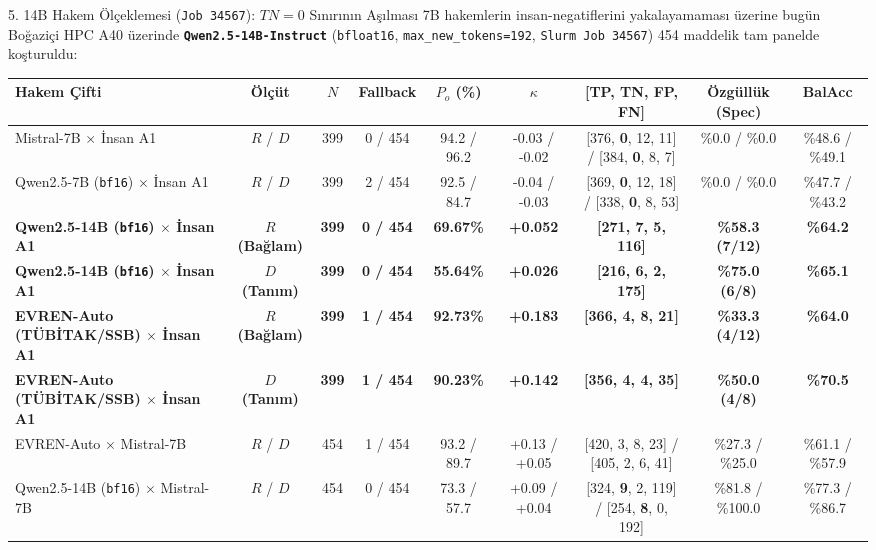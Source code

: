 \documentclass[aspectratio=169,10pt]{beamer}
\begin{document}
\begin{frame}{5. 14B Hakem Ölçeklemesi (\texttt{Job 34567}): $TN = 0$ Sınırının Aşılması}
\scriptsize
7B hakemlerin insan-negatiflerini yakalayamaması üzerine bugün Boğaziçi HPC A40 üzerinde \textbf{\texttt{Qwen2.5-14B-Instruct}} (\texttt{bfloat16}, \texttt{max\_new\_tokens=192}, \texttt{Slurm Job 34567}) 454 maddelik tam panelde koşturuldu:

\vspace{0.1cm}
\begin{table}
\centering
\scriptsize
\begin{tabular}{lcccccccc}
\toprule
\textbf{Hakem Çifti} & \textbf{Ölçüt} & \textbf{$N$} & \textbf{Fallback} & \textbf{$P_o$ (\%)} & \textbf{$\kappa$} & \textbf{[TP, TN, FP, FN]} & \textbf{Özgüllük (Spec)} & \textbf{BalAcc} \\
\midrule
Mistral-7B $\times$ İnsan A1 & $R$ / $D$ & 399 & 0 / 454 & 94.2 / 96.2 & -0.03 / -0.02 & [376, \textbf{0}, 12, 11] / [384, \textbf{0}, 8, 7] & \%0.0 / \%0.0 & \%48.6 / \%49.1 \\
Qwen2.5-7B (\texttt{bf16}) $\times$ İnsan A1 & $R$ / $D$ & 399 & 2 / 454 & 92.5 / 84.7 & -0.04 / -0.03 & [369, \textbf{0}, 12, 18] / [338, \textbf{0}, 8, 53] & \%0.0 / \%0.0 & \%47.7 / \%43.2 \\
\midrule
\textbf{Qwen2.5-14B (\texttt{bf16}) $\times$ İnsan A1} & \textbf{$R$ (Bağlam)} & \textbf{399} & \textbf{0 / 454} & \textbf{69.67\%} & \textbf{+0.052} & \textbf{[271, 7, 5, 116]} & \textbf{\%58.3 (7/12)} & \textbf{\%64.2} \\
\textbf{Qwen2.5-14B (\texttt{bf16}) $\times$ İnsan A1} & \textbf{$D$ (Tanım)} & \textbf{399} & \textbf{0 / 454} & \textbf{55.64\%} & \textbf{+0.026} & \textbf{[216, 6, 2, 175]} & \textbf{\%75.0 (6/8)} & \textbf{\%65.1} \\
\midrule
\textbf{EVREN-Auto (TÜBİTAK/SSB) $\times$ İnsan A1} & \textbf{$R$ (Bağlam)} & \textbf{399} & \textbf{1 / 454} & \textbf{92.73\%} & \textbf{+0.183} & \textbf{[366, 4, 8, 21]} & \textbf{\%33.3 (4/12)} & \textbf{\%64.0} \\
\textbf{EVREN-Auto (TÜBİTAK/SSB) $\times$ İnsan A1} & \textbf{$D$ (Tanım)} & \textbf{399} & \textbf{1 / 454} & \textbf{90.23\%} & \textbf{+0.142} & \textbf{[356, 4, 4, 35]} & \textbf{\%50.0 (4/8)} & \textbf{\%70.5} \\
\midrule
EVREN-Auto $\times$ Mistral-7B & $R$ / $D$ & 454 & 1 / 454 & 93.2 / 89.7 & +0.13 / +0.05 & [420, 3, 8, 23] / [405, 2, 6, 41] & \%27.3 / \%25.0 & \%61.1 / \%57.9 \\
\midrule
Qwen2.5-14B (\texttt{bf16}) $\times$ Mistral-7B & $R$ / $D$ & 454 & 0 / 454 & 73.3 / 57.7 & +0.09 / +0.04 & [324, \textbf{9}, 2, 119] / [254, \textbf{8}, 0, 192] & \%81.8 / \%100.0 & \%77.3 / \%86.7 \\
\bottomrule
\end{tabular}
\end{table}


\end{frame}
\end{document}
